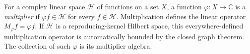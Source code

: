 
For a complex linear space $\mathcal H$ of functions on a set $X$, a function $\varphi:X\to\mathbb C$ is a \emph{multiplier} if $\varphi f\in\mathcal H$ for every $f\in\mathcal H$. Multiplication defines the linear operator $M_\varphi f=\varphi f$. If $\mathcal H$ is a reproducing-kernel Hilbert space, this everywhere-defined multiplication operator is automatically bounded by the closed graph theorem. The collection of such $\varphi$ is its multiplier algebra.
